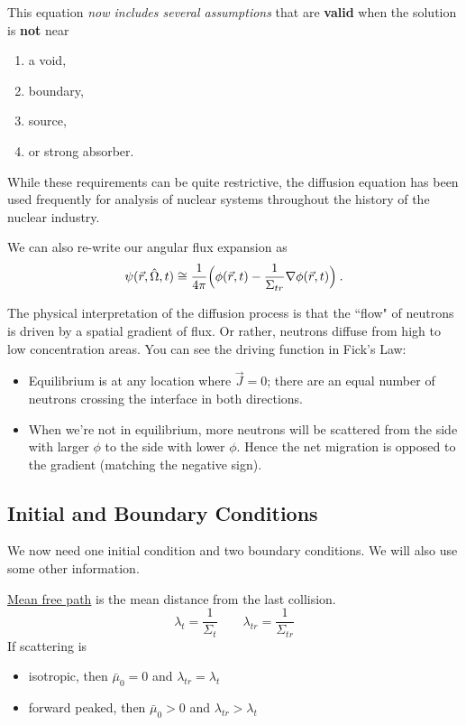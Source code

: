 \documentclass[12pt]{article}
\newcommand{\vOmega}{\ensuremath{\hat{\Omega}}}
\begin{document}
This equation \textit{now includes several assumptions} that are \textbf{valid} when the solution is \textbf{not} near
%
\begin{enumerate}
\item  a void, 
\item boundary, 
\item source, 
\item or strong absorber.
\end{enumerate} 
%
While these requirements can be quite restrictive, the diffusion equation has been used frequently for analysis of nuclear systems throughout the history of the nuclear industry.

We can also re-write our angular flux expansion as
\[\psi(\vec{r}, \vOmega, t) \cong \frac{1}{4\pi}\Bigl(\phi(\vec{r}, t)  -\frac{1}{\Sigma_{tr}} \nabla \phi(\vec{r}, t)\Bigr) \:.\]

The physical interpretation of the diffusion process is that the ``flow" of neutrons is driven by a spatial gradient of flux. Or rather, neutrons diffuse from high to low concentration areas. You can see the driving function in Fick's Law: 
%
\begin{itemize}
\item Equilibrium is at any location where $\vec{J} = 0$; there are an equal number of neutrons crossing the interface in both directions.
\item When we're not in equilibrium, more neutrons will be scattered from the side with larger $\phi$ to the side with lower $\phi$. Hence the net migration is opposed to the gradient (matching the negative sign). 
\end{itemize}
 

\subsection*{Initial and Boundary Conditions}

We now need one initial condition and two boundary conditions. We will also use some other information.

\underline{Mean free path} is the mean distance from the last collision.
\[\lambda_{t} = \frac{1}{\Sigma_t} \qquad \lambda_{tr} = \frac{1}{\Sigma_{tr}}\]
%
If scattering is 
\begin{itemize}
\item isotropic, then $\bar{\mu}_0 = 0$ and $\lambda_{tr} = \lambda_{t}$
\item forward peaked, then $\bar{\mu}_0 > 0$ and $\lambda_{tr} > \lambda_{t}$
\end{itemize}	
\end{document}
